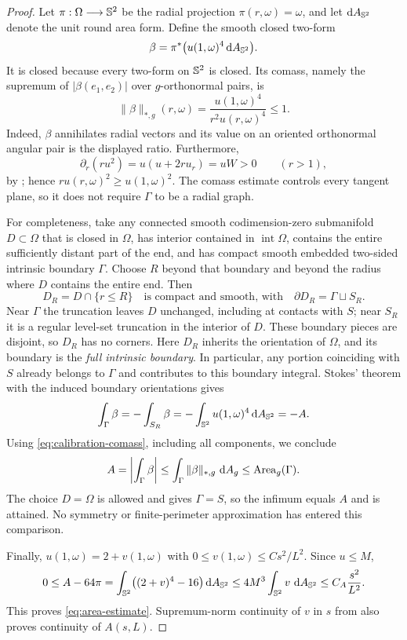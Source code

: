 \begin{proof}
Let $\pi:\Omega\longrightarrow\mathbb S^2$ be the radial projection
$\pi(r,\omega)=\omega$, and let $\mathop{}\!\mathrm d A_{\mathbb S^2}$ denote the unit round area
form.  Define the smooth closed two-form
\[
 \beta=\pi^*\bigl(u(1,\omega)^4\mathop{}\!\mathrm d A_{\mathbb S^2}\bigr).
\]
It is closed because every two-form on $\mathbb S^2$ is closed.  Its comass, namely
the supremum of $|\beta(e_1,e_2)|$ over $g$-orthonormal pairs, is
\begin{equation}\label{eq:calibration-comass}
 \|\beta\|_{*,g}(r,\omega)
 =\frac{u(1,\omega)^4}{r^2u(r,\omega)^4}\le1.
\end{equation}
Indeed, $\beta$ annihilates radial vectors and its value on an oriented
orthonormal angular pair is the displayed ratio.  Furthermore,
\[
 \partial_r(ru^2)=u(u+2ru_r)=uW>0\qquad(r>1),
\]
by ; hence $ru(r,\omega)^2\ge u(1,\omega)^2$.
The comass estimate controls every tangent plane, so it does not require
$\Gamma$ to be a radial graph.

For completeness, take any connected smooth codimension-zero submanifold
$D\subset\Omega$ that is closed in $\Omega$, has interior contained in
$\operatorname{int}\Omega$, contains the entire sufficiently distant part
of the end, and has compact smooth embedded two-sided intrinsic boundary
$\Gamma$.  Choose $R$ beyond that boundary and beyond the radius where $D$
contains the entire end.  Then
\[
 D_R=D\cap\{r\le R\}
 \quad\text{is compact and smooth, with}\quad
 \partial D_R=\Gamma\sqcup S_R.
\]
Near $\Gamma$ the truncation leaves $D$ unchanged, including at contacts
with $S$; near $S_R$ it is a regular level-set truncation in the interior
of $D$.  These boundary pieces are disjoint, so $D_R$ has no corners.
Here $D_R$ inherits the orientation of $\Omega$, and its boundary is the
\emph{full intrinsic boundary}.  In particular, any portion coinciding with
$S$ already belongs to $\Gamma$ and contributes to this boundary integral.
Stokes' theorem with the induced boundary orientations gives
\[
 \int_\Gamma\beta=-\int_{S_R}\beta
 =-\int_{\mathbb S^2}u(1,\omega)^4\mathop{}\!\mathrm d A_{\mathbb S^2}=-A.
\]
Using \eqref{eq:calibration-comass}, including all components, we conclude
\[
 A=\left|\int_\Gamma\beta\right|
 \le\int_\Gamma\|\beta\|_{*,g}\,\mathop{}\!\mathrm d A_g
 \le\operatorname{Area}_g(\Gamma).
\]
The choice $D=\Omega$ is allowed and gives $\Gamma=S$, so the infimum equals
$A$ and is attained.  No symmetry or finite-perimeter approximation has
entered this comparison.

Finally, $u(1,\omega)=2+v(1,\omega)$ with
$0\le v(1,\omega)\le Cs^2/L^2$.  Since $u\le M$,
\[
 0\le A-64\pi
 =\int_{\mathbb S^2}\bigl((2+v)^4-16\bigr)\mathop{}\!\mathrm d A_{\mathbb S^2}
 \le4M^3\int_{\mathbb S^2}v\,\mathop{}\!\mathrm d A_{\mathbb S^2}
 \le C_A\frac{s^2}{L^2}.
\]
This proves \eqref{eq:area-estimate}.  Supremum-norm continuity of $v$ in $s$
from  also proves continuity of $A(s,L)$.
\end{proof}
